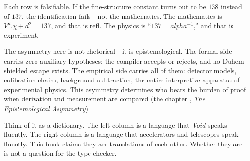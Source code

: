 \documentclass[11pt,a4paper]{book}
\def\alpha{alpha}%
\def\cdot{.}%
\def\texttt#1{#1}%
\begin{document}
Each row is falsifiable. If the fine-structure constant turns out to be $138$ instead of $137$, the identification fails---not the mathematics. The mathematics is $V^d \cdot \chi + d^2 = 137$, and that is \texttt{refl}. The physics is ``$137 = \alpha^{-1}$,'' and that is experiment.

The asymmetry here is not rhetorical---it is epistemological. The formal side carries zero auxiliary hypotheses: the compiler accepts or rejects, and no Duhem-shielded escape exists. The empirical side carries all of them: detector models, calibration chains, background subtraction, the entire interpretive apparatus of experimental physics. This asymmetry determines who bears the burden of proof when derivation and measurement are compared (the chapter \emph{}, \textit{The Epistemological Asymmetry}).

Think of it as a dictionary. The left column is a language that \textit{Void} speaks fluently. The right column is a language that accelerators and telescopes speak fluently. This book claims they are translations of each other. Whether they are is not a question for the type checker.
\end{document}

